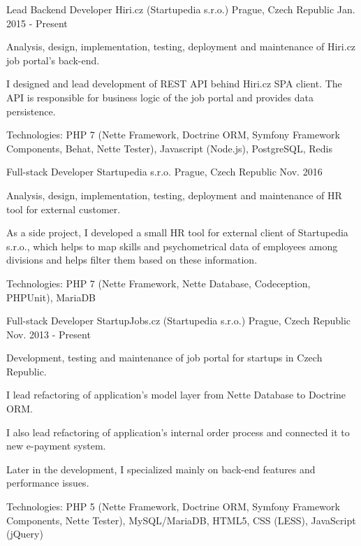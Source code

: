 \begin{cventries}
  \cventry
    {Lead Backend Developer}
    {Hiri.cz (Startupedia s.r.o.)}
    {Prague, Czech Republic}
    {Jan. 2015 - Present}
    {
      \begin{cvitems}
        \item {Analysis, design, implementation, testing, deployment and maintenance of Hiri.cz job portal's back-end.}
        \item {I designed and lead development of REST API behind Hiri.cz SPA client. The API is responsible for business logic of the job portal and provides data persistence.}
        \item {Technologies: PHP 7 (Nette Framework, Doctrine ORM, Symfony Framework Components, Behat, Nette Tester), Javascript (Node.js), PostgreSQL, Redis}
      \end{cvitems}
    }
  \cventry
    {Full-stack Developer}
    {Startupedia s.r.o.}
    {Prague, Czech Republic}
    {Nov. 2016}
    {
      \begin{cvitems}
        \item {Analysis, design, implementation, testing, deployment and maintenance of HR tool for external customer.}
        \item {As a side project, I developed a small HR tool for external client of Startupedia s.r.o., which helps to map skills and psychometrical data of employees among divisions and helps filter them based on these information.}
        \item {Technologies: PHP 7 (Nette Framework, Nette Database, Codeception, PHPUnit), MariaDB}
      \end{cvitems}
    }
  \cventry
    {Full-stack Developer}
    {StartupJobs.cz (Startupedia s.r.o.)}
    {Prague, Czech Republic}
    {Nov. 2013 - Present}
    {
      \begin{cvitems}
        \item {Development, testing and maintenance of job portal for startups in Czech Republic.}
        \item {I lead refactoring of application's model layer from Nette Database to Doctrine ORM.}
        \item {I also lead refactoring of application's internal order process and connected it to new e-payment system.}
        \item {Later in the development, I specialized mainly on back-end features and performance issues.}
        \item {Technologies: PHP 5 (Nette Framework, Doctrine ORM, Symfony Framework Components, Nette Tester), MySQL/MariaDB, HTML5, CSS (LESS), JavaScript (jQuery)}

\end{cvitems}}
\end{cventries}

